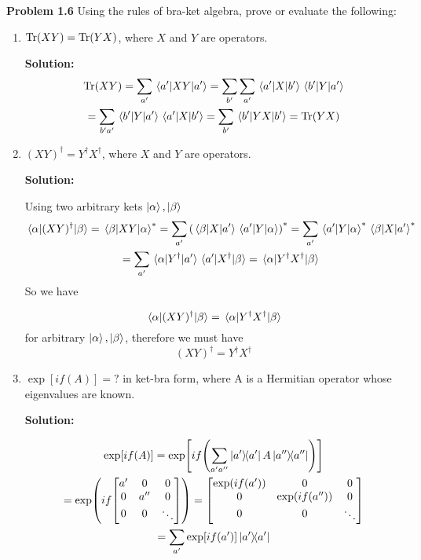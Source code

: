 \item \textbf{Problem 1.6}  Using the rules of bra-ket algebra, prove or evaluate the following:
\begin{enumerate}
	\item $\Tr(XY) = \Tr(YX)$, where $X$ and $Y$ are operators.

	      \textbf{Solution:}
	      \begin{gather*}
		      \Tr(XY) = \sum_{a'} \ev{XY}{a'} = \sum_{b'}\sum_{a'} \mel{a'}{X}{b'} \mel{b'}{Y}{a'} \\
		      = \sum_{b'a'} \mel{b'}{Y}{a'} \mel{a'}{X}{b'} = \sum_{b'} \mel{b'}{YX}{b'} = \Tr(YX)
	      \end{gather*}

	\item $(XY)^\dag = Y^\dagger X^\dag$, where $X$ and $Y$ are operators.

	      \textbf{Solution:}

	      Using two arbitrary kets $\ket \alpha, \ket \beta$
	      \begin{gather*}
		      \mel{\alpha}{(XY)^\dag}{\beta} = \mel{\beta}{XY}{\alpha}^* = \sum_{a'} \qty(\mel{\beta}{X}{a'}\mel{a'}{Y}{\alpha})^* = \sum_{a'} \mel{a'}{Y}{\alpha}^* \mel{\beta}{X}{a'}^* \\
		      = \sum_{a'}\mel{\alpha}{Y^\dag}{a'}\mel{a'}{X^\dag}{\beta} = \mel{\alpha}{Y^\dag X^\dag}{\beta}
	      \end{gather*}
	      So we have

	      \[
		      \mel{\alpha}{(XY)^\dag}{\beta}=\mel{\alpha}{Y^\dag X^\dag}{\beta}
	      \]
	      for arbitrary $\ket \alpha, \ket \beta$, therefore we must have
	      \[
		      (XY)^\dag = Y^\dagger X^\dag
	      \]



	\item $\exp[if(A)] =?$ in ket-bra form, where A is a Hermitian operator whose eigenvalues are known.

	      \textbf{Solution:}

	      \begin{gather*}
		      \exp[if(A)] = \exp[if\qty(\sum_{a'a''} \op{a'} A \op{a''})] \\
		      = \exp(if \mqty[\dmat[0]{a',a'' , \ddots}]) = \mqty[\dmat[0]{\exp(if(a')),\exp(if(a'')), \ddots}]\\
		      = \sum_{a'}\exp[if(a')]\op{a'}
	      \end{gather*}



\end{enumerate}
